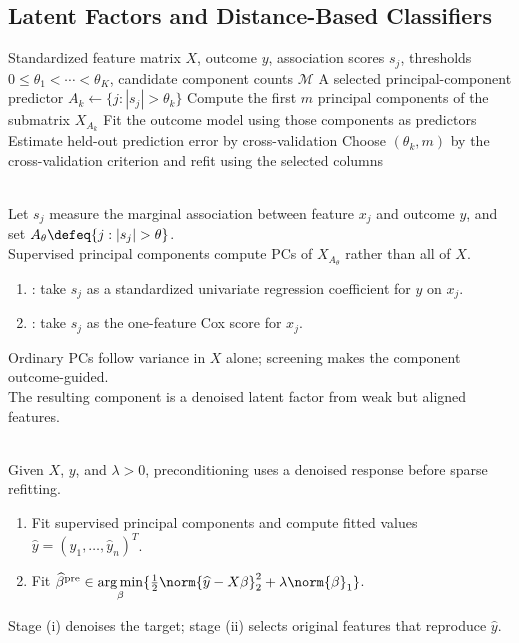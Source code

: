 \subsection{Latent Factors and Distance-Based Classifiers}
\begin{breakablealgorithm}
\caption{Supervised Principal Components}
\label{alg:sl-supervised-principal-components}
\begin{algorithmic}
\Require Standardized feature matrix $X$, outcome $y$, association scores $s_j$, thresholds $0\leq\theta_1<\cdots<\theta_K$, candidate component counts $\mathcal{M}$
\Ensure A selected principal-component predictor
\State $A_k\gets\{j: |s_j|>\theta_k\}$
\State Compute the first $m$ principal components of the submatrix $X_{A_k}$
\State Fit the outcome model using those components as predictors
\State Estimate held-out prediction error by cross-validation
\EndFor
\EndFor
\State Choose $(\theta_k,m)$ by the cross-validation criterion and refit using the selected columns
\end{algorithmic}
\end{breakablealgorithm}

\begin{remark} \label{rem:sl-supervised-pc-latent-factor-view} \\
Let $s_j$ measure the marginal association between feature $x_j$ and outcome $y$, and set $A_\theta\defeq\{j:|s_j|>\theta\}$.\\
Supervised principal components compute PCs of $X_{A_\theta}$ rather than all of $X$.
\begin{enumerate}[label=(\roman*)]
\setlength{\itemsep}{0pt}
\item {}: take $s_j$ as a standardized univariate regression coefficient for $y$ on $x_j$.
\item {}: take $s_j$ as the one-feature Cox score for $x_j$.
\end{enumerate}
Ordinary PCs follow variance in $X$ alone; screening makes the component outcome-guided.\\
The resulting component is a denoised latent factor from weak but aligned features.
\end{remark}

\begin{method} \label{meth:sl-preconditioned-lasso} \\
Given $X$, $y$, and $\lambda>0$, preconditioning uses a denoised response before sparse refitting.
\begin{enumerate}[label=(\roman*)]
\setlength{\itemsep}{0pt}
\item Fit supervised principal components and compute fitted values $\widehat{y}=(\widehat{y}_1,\ldots,\widehat{y}_n)^T$.
\item Fit $\widehat{\beta}^{\mathrm{pre}}\in\operatorname*{arg\,min}\limits_{\beta}\{\frac{1}{2}\norm{\widehat{y}-X\beta}_2^2+\lambda\norm{\beta}_1\}$.
\end{enumerate}
Stage (i) denoises the target; stage (ii) selects original features that reproduce $\widehat{y}$.
\end{method}


